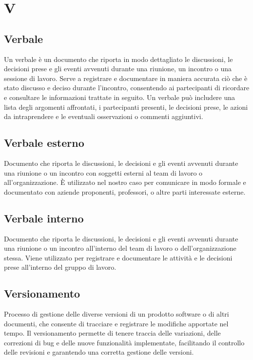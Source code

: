 \section{V} 
\subsection{Verbale} 
Un verbale è un documento che riporta in modo dettagliato le discussioni, le decisioni prese e gli eventi avvenuti durante una riunione, un incontro o una sessione di lavoro. Serve a registrare e documentare in maniera accurata ciò che è stato discusso e deciso durante l'incontro, consentendo ai partecipanti di ricordare e consultare le informazioni trattate in seguito. Un verbale può includere una lista degli argomenti affrontati, i partecipanti presenti, le decisioni prese, le azioni da intraprendere e le eventuali osservazioni o commenti aggiuntivi. 
\subsection{Verbale esterno} 
Documento che riporta le discussioni, le decisioni e gli eventi avvenuti durante una riunione o un incontro con soggetti esterni al team di lavoro o all'organizzazione. È utilizzato nel nostro caso per comunicare in modo formale e documentato con aziende proponenti, professori, o altre parti interessate esterne.
\subsection{Verbale interno} 
Documento che riporta le discussioni, le decisioni e gli eventi avvenuti durante una riunione o un incontro all'interno del team di lavoro o dell'organizzazione stessa. Viene utilizzato per registrare e documentare le attività e le decisioni prese all'interno del gruppo di lavoro.
\subsection{Versionamento} 
Processo di gestione delle diverse versioni di un prodotto software o di altri documenti, che consente di tracciare e registrare le modifiche apportate nel tempo. Il versionamento permette di tenere traccia delle variazioni, delle correzioni di bug e delle nuove funzionalità implementate, facilitando il controllo delle revisioni e garantendo una corretta gestione delle versioni. 
